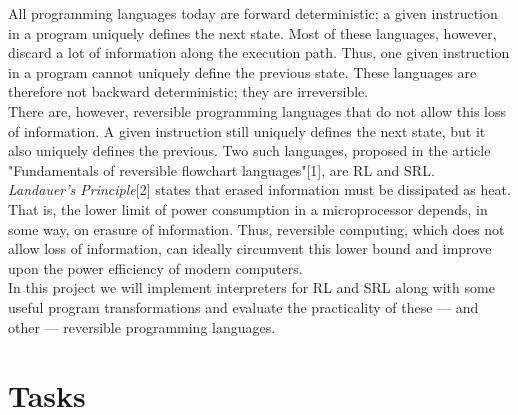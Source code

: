 



All programming languages today are forward deterministic; a given instruction in a program uniquely defines the next state. Most of these languages, however, discard a lot of information along the execution path. Thus, one given instruction in a program cannot uniquely define the previous state. These languages are therefore not backward deterministic; they are irreversible. \\
\indent There are, however, reversible programming languages that do not allow this loss of information. A given instruction still uniquely defines the next state, but it also uniquely defines the previous. Two such languages, proposed in the article "Fundamentals of reversible flowchart languages"[1], are RL and SRL. \\
\indent \textit{Landauer's Principle}[2] states that erased information must be dissipated as heat. That is, the lower limit of power consumption in a microprocessor depends, in some way, on erasure of information. Thus, reversible computing, which does not allow loss of information, can ideally circumvent this lower bound and improve upon the power efficiency of modern computers. \\
\indent In this project we will implement interpreters for RL and SRL along with some useful program transformations and evaluate the practicality of these --- and other --- reversible programming languages.

\section{Tasks}
\label{sec:tasks}


